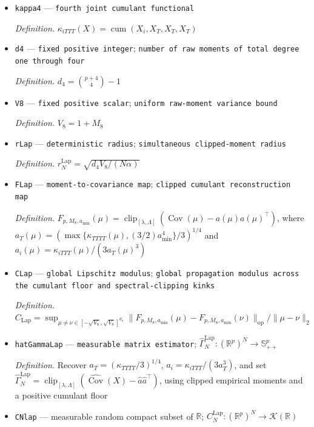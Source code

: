\documentclass{article}
\begin{document}
\begin{itemize}
  \item \texttt{kappa4} --- \texttt{fourth joint cumulant functional}
  \par\smallskip\noindent\emph{Definition.} \(\kappa_{iTTT}(X)=\operatorname{cum}(X_i,X_T,X_T,X_T)\)
  \item \texttt{d4} --- \texttt{fixed positive integer}; \texttt{number of raw moments of total degree one through four}
  \par\smallskip\noindent\emph{Definition.} \(d_4=\binom{p+4}{4}-1\)
  \item \texttt{V8} --- \texttt{fixed positive scalar}; \texttt{uniform raw-\allowbreak{}moment variance bound}
  \par\smallskip\noindent\emph{Definition.} \(V_8=1+M_8\)
  \item \texttt{rLap} --- \texttt{deterministic radius}; \texttt{simultaneous clipped-\allowbreak{}moment radius}
  \par\smallskip\noindent\emph{Definition.} \(r_N^{\mathrm{Lap}}=\sqrt{d_4V_8/(N\alpha)}\)
  \item \texttt{FLap} --- \texttt{moment-\allowbreak{}to-\allowbreak{}covariance map}; \texttt{clipped cumulant reconstruction map}
  \par\smallskip\noindent\emph{Definition.} \(F_{p,M_8,a_{\min}}(\mu)=\operatorname{clip}_{[\lambda,\Lambda]}(\operatorname{Cov}(\mu)-a(\mu)a(\mu)^\top)\), where \(a_T(\mu)=(\max\{\kappa_{TTTT}(\mu),(3/2)a_{\min}^4\}/3)^{1/4}\) and \(a_i(\mu)=\kappa_{iTTT}(\mu)/(3a_T(\mu)^3)\)
  \item \texttt{CLap} --- \texttt{global Lipschitz modulus}; \texttt{global propagation modulus across the cumulant floor and spectral-\allowbreak{}clipping kinks}
  \par\smallskip\noindent\emph{Definition.} \(C_{\mathrm{Lap}}=\sup_{\mu\ne\nu\in[-\sqrt{V_8},\sqrt{V_8}]^{d_4}}\|F_{p,M_8,a_{\min}}(\mu)-F_{p,M_8,a_{\min}}(\nu)\|_{\mathrm{op}}/\|\mu-\nu\|_2\)
  \item \texttt{hatGammaLap} --- \texttt{measurable matrix estimator}; \(\widehat\Gamma_N^{\mathrm{Lap}}:(\mathbb R^p)^N\to\mathbb S_{++}^p\)
  \par\smallskip\noindent\emph{Definition.} Recover \(a_T=(\kappa_{TTTT}/3)^{1/4}\), \(a_i=\kappa_{iTTT}/(3a_T^3)\), and set \(\widehat\Gamma_N^{\mathrm{Lap}}=\operatorname{clip}_{[\lambda,\Lambda]}(\widehat{\operatorname{Cov}}(X)-\widehat a\widehat a^\top)\), using clipped empirical moments and a positive cumulant floor
  \item \texttt{CNlap} --- measurable random compact subset of \(\mathbb R\); \(C_N^{\mathrm{Lap}}:(\mathbb R^p)^N\to\mathcal K(\mathbb R)\)

\end{itemize}
\end{document}
